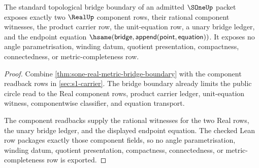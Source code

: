 \begin{theorem}
\label{thm:s1-real-metric-coordinate-boundary}
The standard topological bridge boundary of an admitted $\SOneUp$ packet
exposes exactly two $\RealUp$ component rows, their rational component
witnesses, the product carrier row, the unit-equation row, a unary bridge
ledger, and the endpoint equation
$\hsame(\mathsf{bridge},\mathsf{append}(\mathsf{point},\mathsf{equation}))$.
It exposes no angle parametrisation, winding datum, quotient presentation,
compactness, connectedness, or metric-completeness row.
\end{theorem}
\begin{proof}
Combine \autoref{thm:sone-real-metric-bridge-boundary} with the component
readback rows in \autoref{sec:s1-carrier}. The bridge boundary already limits
the public circle read to the Real component rows, product carrier ledger,
unit-equation witness, componentwise classifier, and equation transport.

The component readbacks supply the rational witnesses for the two Real rows,
the unary bridge ledger, and the displayed endpoint equation. The checked Lean
row packages exactly those component fields, so no angle parametrisation,
winding datum, quotient presentation, compactness, connectedness, or
metric-completeness row is exported.
\end{proof}

